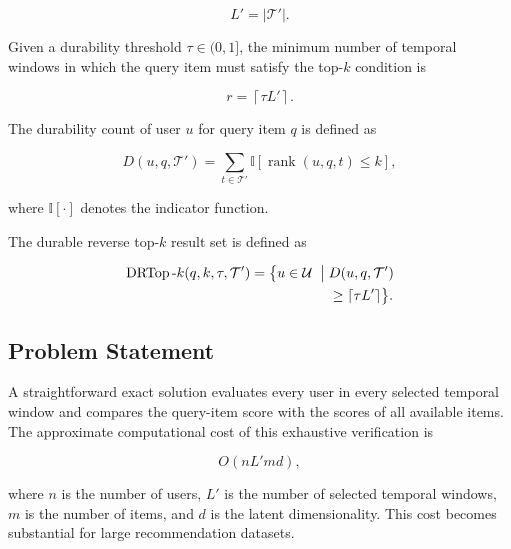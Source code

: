 \begin{equation}
L'=\left|\mathcal{T}'\right|.
\label{eq:selected_window_count}
\end{equation}

Given a durability threshold $\tau\in(0,1]$, the minimum number of temporal windows in which the query item must satisfy the top-$k$ condition is

\begin{equation}
r=\left\lceil\tau L'\right\rceil.
\label{eq:durability_requirement}
\end{equation}

The durability count of user $u$ for query item $q$ is defined as

\begin{equation}
D(u,q,\mathcal{T}')
=
\sum_{t\in\mathcal{T}'}
\mathbb{I}
\left[
\operatorname{rank}(u,q,t)\leq k
\right],
\label{eq:durability_count}
\end{equation}

where $\mathbb{I}[\cdot]$ denotes the indicator function.

The durable reverse top-$k$ result set is defined as

\begin{equation}
\begin{aligned}
\operatorname{DRTop}\text{-}k(q,k,\tau,\mathcal{T}')
=
\bigl\{
u\in\mathcal{U}
\;\bigm|\;&
D(u,q,\mathcal{T}') \\
&\geq \left\lceil\tau L'\right\rceil
\bigr\}.
\end{aligned}
\label{eq:durable_reverse_topk}
\end{equation}


\subsection{Problem Statement}
\label{subsec:problem_statement}

A straightforward exact solution evaluates every user in every selected temporal window and compares the query-item score with the scores of all available items. The approximate computational cost of this exhaustive verification is

\begin{equation}
O\left(nL'md\right),
\label{eq:exhaustive_complexity}
\end{equation}

where $n$ is the number of users, $L'$ is the number of selected temporal windows, $m$ is the number of items, and $d$ is the latent dimensionality. This cost becomes substantial for large recommendation datasets.

